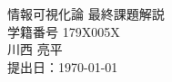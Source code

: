 ﻿\documentclass[a4paper,10pt,fleqn]{jarticle}
\begin{document}
\begin{titlepage}
\begin{center}
\vspace*{150truept}
{\Huge 情報可視化論 最終課題解説}\\ %
\vspace{10truept}
\vspace{200truept}
{\Large 学籍番号 179X005X}\\ %
\vspace{20truept}
{\Large 川西 亮平}\\ %
\vspace{20truept}
{\Large 提出日：\today}\\ %
\end{center}
\end{titlepage}
\end{document}
